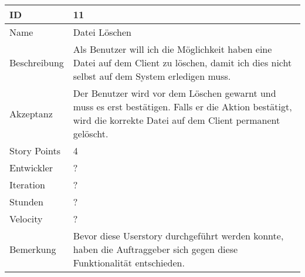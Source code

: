 \begin{table}[htbp]
    \begin{minipage}{\linewidth}
        \setlength{\tymax}{0.5\linewidth}
        \centering
        \small
        \begin{tabulary}{\textwidth}{|l|p{10cm}|} \hline
            ID   &11\\\hline
            Name  &Datei Löschen\\\hline
            Beschreibung&Als Benutzer will ich die Möglichkeit haben eine Datei auf dem Client zu löschen, damit ich dies nicht selbst auf dem System erledigen muss.\\\hline
            Akzeptanz &Der Benutzer wird vor dem Löschen gewarnt und muss es erst bestätigen. Falls er die Aktion bestätigt, wird die korrekte Datei auf dem Client permanent gelöscht.\\\hline
            Story Points&4\\\hline
            Entwickler &?\\\hline
            Iteration &?\\\hline
            Stunden  &?\\\hline
            Velocity &?\\\hline
            Bemerkung & Bevor diese Userstory durchgeführt werden konnte, haben die Auftraggeber sich gegen diese Funktionalität entschieden.
            \\\hline
        \end{tabulary}
    \end{minipage}
\end{table}



